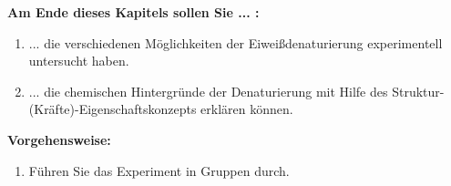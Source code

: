 \documentclass{scrartcl}  %
\begin{document}
		\begin{minipage}{0.7\textwidth}
			\noindent \textbf{Am Ende dieses Kapitels sollen Sie ... :}
			\begin{enumerate}
				\item ... die verschiedenen Möglichkeiten der Eiweißdenaturierung experimentell untersucht haben.
				\item ... die chemischen Hintergründe der Denaturierung mit Hilfe des Struktur-(Kräfte)-Eigenschaftskonzepts erklären können.
			\end{enumerate}
			\textbf{Vorgehensweise:}
			\begin{enumerate}
				\item Führen Sie das Experiment in Gruppen durch.
			\end{enumerate}
			
		\end{minipage}
		\hspace{0.1\textwidth}
\end{document}
